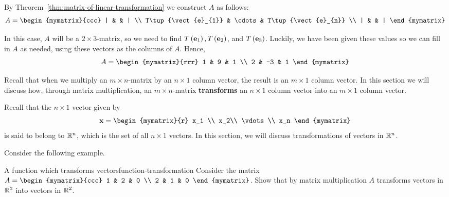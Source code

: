 \begin{solution} By Theorem~\ref{thm:matrix-of-linear-transformation} we construct $A$ as follows:
  \begin{equation*}
    A = 
    \begin{mymatrix}{ccc}
      | &  & | \\
      T\tup{\vect{e}_{1}} & \cdots & T\tup{\vect{e}_{n}} \\
      | &  & |
    \end{mymatrix}
  \end{equation*}

  In this case, $A$ will be a $2 \times 3$-matrix, so we need to find $T
  \left(\mbox{\bf e}_1 \right), T \left(\mbox{\bf e}_2 \right)$, and $T \left(\mbox{\bf e}_3
  \right)$. Luckily, we have been given these values so we can fill in
  $A$ as needed, using these vectors as the columns of $A$.  Hence,
  \begin{equation*}
    A=\begin{mymatrix}{rrr}
      1 & 9 & 1 \\
      2 & -3 & 1
    \end{mymatrix}
  \end{equation*}
\end{solution}

Recall that when we multiply an $m\times n$-matrix by an $n\times 1 $
column vector, the result is an $m\times 1$ column vector. In this
section we will discuss how, through matrix multiplication, an $m
\times n$-matrix \textbf{transforms} an $n\times 1$ column vector into
an $m \times 1$ column vector.

Recall that the $n \times 1$ vector given by
\begin{equation*}
  \vect{x} = 
  \begin{mymatrix}{r}
    x_1 \\
    x_2\\ 
    \vdots \\
    x_n
  \end{mymatrix}
\end{equation*}
is said to belong to $\mathbb{R}^n$, which is the set of all $n \times 1$ vectors. In this section, we will discuss transformations of vectors in $\mathbb{R}^n$. 

Consider the following example. 

\begin{example}{A function which transforms vectors}{function-transformation}
  Consider the matrix $A = \begin{mymatrix}{ccc}
    1 & 2 & 0 \\
    2 & 1 & 0
  \end{mymatrix}$. 
  Show that by matrix multiplication $A$ transforms vectors in $\mathbb{R}^3$ into vectors in $\mathbb{R}^2$.
\end{example}

